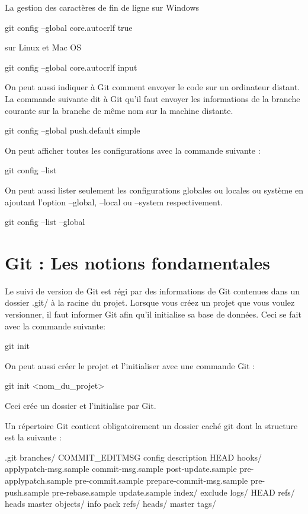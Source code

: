\documentclass[11pt, a4paper]{book}
\begin{document}
La gestion des caractères de fin de ligne sur Windows
\begin{bash}
git config --global core.autocrlf true
\end{bash}
sur Linux et Mac OS
\begin{bash}
git config --global core.autocrlf input
\end{bash}
On peut aussi indiquer à Git comment envoyer le code sur un ordinateur distant. La commande suivante dit à Git qu'il faut envoyer les informations de la branche courante sur la branche de même nom sur la machine distante.
\begin{bash}
git config --global push.default simple
\end{bash}

On peut afficher toutes les configurations avec la commande suivante :
\begin{bash}
git config --list
\end{bash}
On peut aussi lister seulement les configurations globales ou locales ou système en ajoutant l'option --global, --local ou --system respectivement.
\begin{bash}
git config --list --global 
\end{bash}
\chapter{Git :  Les notions fondamentales}
Le suivi de version de Git est régi par des informations de Git contenues dans un dossier .git/ à la racine du projet. Lorsque vous créez un projet que vous voulez versionner, il faut informer Git afin qu'il initialise sa base de données. Ceci se fait avec la commande suivante:
\begin{bash}
git init
\end{bash}

On peut aussi créer le projet et l'initialiser avec une commande Git :
\begin{bash}
git init <nom_du_projet>
\end{bash}
Ceci crée un dossier et l'initialise par Git. 

Un répertoire Git contient obligatoirement un dossier caché git dont la structure est la suivante :

\begin{bash}
.git
    branches/
    COMMIT_EDITMSG
    config
    description
    HEAD
    hooks/
        applypatch-msg.sample
        commit-msg.sample
        post-update.sample
        pre-applypatch.sample
        pre-commit.sample
        prepare-commit-msg.sample
        pre-push.sample
        pre-rebase.sample
        update.sample
    index/
        exclude
    logs/
        HEAD
        refs/
            heads
                master
    objects/
        info
        pack
    refs/
        heads/
            master
        tags/
\end{bash}
\end{document}
